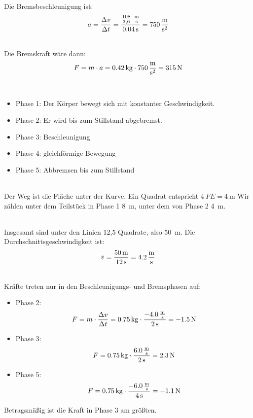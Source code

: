 \documentclass[a4paper]{article}
\begin{document}
\vspace{0.5 cm}

\\
Die Bremsbeschleunigung ist:
$$a= {\Delta v \over \Delta t} ={{108 \over 3,6}~\SI{}{\meter\over \second}\over \SI{0,04}{\second}}=\SI{750}{\meter\over {\second^2}} $$
\vspace{0.5 cm}

\\
Die Bremskraft wäre dann:
$$ F = m \cdot a = \SI{0,42}{\kilogram} \cdot \SI{750}{\meter\over {\second^2}}=\SI{315}{\newton}$$
\vspace{0.5 cm}

\\
\begin{itemize}
	\item Phase 1: Der Körper bewegt sich mit konstanter Geschwindigkeit.
	\item Phase 2: Er wird bis zum Stillstand abgebremst. 
	\item Phase 3: Beschleunigung 
	\item Phase 4: gleichförmige Bewegung
	\item Phase 5: Abbremsen bis zum Stillstand
\end{itemize}
\vspace{0.5 cm}

\\
Der Weg ist die Fläche unter der Kurve. Ein Quadrat entspricht $4~FE=\SI{4}{\meter}$ Wir zählen unter dem Teilstück in Phase 1 8~m, unter dem von Phase 2 4~m.
\vspace{0.5 cm}

\\
Insgesamt sind unter den Linien 12,5 Quadrate, also 50~m.
Die Durchschnittsgeschwindigkeit ist:
$$\bar v={\SI{50}{\meter} \over \SI{12}{\second}}=\SI{4,2}{\meter\over \second}$$
\vspace{0.5 cm}

\\
Kräfte treten nur in den Beschleunigungs- und Bremsphasen auf:
\begin{itemize}
	\item Phase 2: $$ F = m \cdot {\Delta v \over \Delta t} = \SI{0,75}{\kilogram} \cdot {\SI{-4,0}{\meter\over \second} \over \SI{2}{\second}}=\SI{-1,5}{\newton}$$
	\item Phase 3: $$ F = \SI{0,75}{\kilogram} \cdot {\SI{6,0}{\meter\over \second} \over \SI{2}{\second}}=\SI{2,3}{\newton}$$
	\item Phase 5: $$ F = \SI{0,75}{\kilogram} \cdot {\SI{-6,0}{\meter\over \second} \over \SI{4}{\second}}=\SI{-1,1}{\newton}$$
\end{itemize}
Betragsmäßig ist die Kraft in Phase 3 am größten.
\vspace{0.5 cm}
\end{document}

